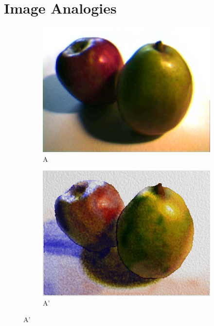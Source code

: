 \documentclass{article}
\begin{document}
\section{Image Analogies}
\begin{figure}[!ht]
\begin{subfigure}{0.5\textwidth}
\centering
\includegraphics[width=0.75\linewidth]{watercolor-src.jpg}
\caption{A}
\end{subfigure}
\begin{subfigure}{0.5\textwidth}
\centering
\includegraphics[width=0.75\linewidth]{watercolor.jpg}
\caption{A'}
\end{subfigure}
\end{figure}
\end{document}
